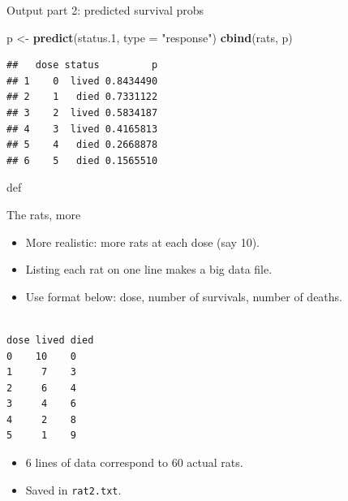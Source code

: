 \documentclass[ignorenonframetext,]{beamer}
\newenvironment{Shaded}{\begin{snugshade}}{\end{snugshade}}
\newcommand{\DataTypeTok}[1]{\textcolor[rgb]{0.13,0.29,0.53}{#1}}
\newcommand{\FloatTok}[1]{\textcolor[rgb]{0.00,0.00,0.81}{#1}}
\newcommand{\KeywordTok}[1]{\textcolor[rgb]{0.13,0.29,0.53}{\textbf{#1}}}
\newcommand{\NormalTok}[1]{#1}
\newcommand{\StringTok}[1]{\textcolor[rgb]{0.31,0.60,0.02}{#1}}
\begin{document}
\begin{frame}[fragile]{Output part 2: predicted survival probs}
\protect\hypertarget{output-part-2-predicted-survival-probs}{}

\begin{Shaded}
\begin{Highlighting}[]
\NormalTok{p <-}\StringTok{ }\KeywordTok{predict}\NormalTok{(status}\FloatTok{.1}\NormalTok{, }\DataTypeTok{type =} \StringTok{"response"}\NormalTok{)}
\KeywordTok{cbind}\NormalTok{(rats, p)}
\end{Highlighting}
\end{Shaded}

\begin{verbatim}
##   dose status         p
## 1    0  lived 0.8434490
## 2    1   died 0.7331122
## 3    2  lived 0.5834187
## 4    3  lived 0.4165813
## 5    4   died 0.2668878
## 6    5   died 0.1565510
\end{verbatim}

def

\end{frame}

\begin{frame}[fragile]{The rats, more}
\protect\hypertarget{the-rats-more}{}

\begin{itemize}
\item
  More realistic: more rats at each dose (say 10).
\item
  Listing each rat on one line makes a big data file.
\item
  Use format below: dose, number of survivals, number of deaths.
\end{itemize}

\begin{verbatim}

dose lived died
0    10    0
1     7    3 
2     6    4 
3     4    6 
4     2    8 
5     1    9  
\end{verbatim}

\begin{itemize}
\item
  6 lines of data correspond to 60 actual rats.
\item
  Saved in \texttt{rat2.txt}.
\end{itemize}

\end{frame}
\end{document}
